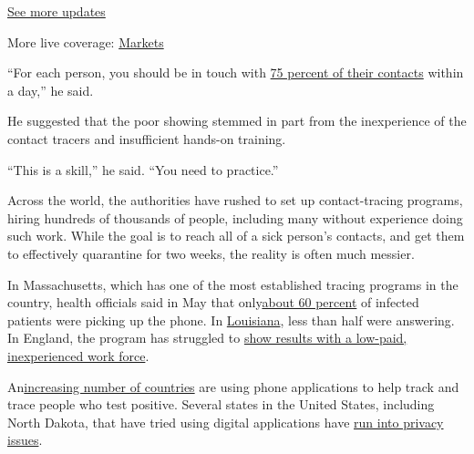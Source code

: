 \href{https://www.nytimes3xbfgragh.onion/2020/08/04/world/coronavirus-cases.html?action=click\&pgtype=Article\&state=default\&region=MAIN_CONTENT_1\&context=storylines_live_updates}{See
more updates}

More live coverage:
\href{https://www.nytimes3xbfgragh.onion/live/2020/08/04/business/stock-market-today-coronavirus?action=click\&pgtype=Article\&state=default\&region=MAIN_CONTENT_1\&context=storylines_live_updates}{Markets}

``For each person, you should be in touch with
\href{https://covidlocal.org/assets/documents/COVID\%20Local\%20Metrics\%20overview.pdf}{75
percent of their contacts} within a day,'' he said.

He suggested that the poor showing stemmed in part from the inexperience
of the contact tracers and insufficient hands-on training.

``This is a skill,'' he said. ``You need to practice.''

Across the world, the authorities have rushed to set up contact-tracing
programs, hiring hundreds of thousands of people, including many without
experience doing such work. While the goal is to reach all of a sick
person's contacts, and get them to effectively quarantine for two weeks,
the reality is often much messier.

In Massachusetts, which has one of the most established tracing programs
in the country, health officials said in May that
only\href{https://www.boston25news.com/news/health/more-than-60-percent-mass-contact-tracing-calls-answered/4NK2EEGVEVCDFBMICEKZXFCXR4/}{about
60 percent} of infected patients were picking up the phone. In
\href{https://www.governing.com/now/Louisiana-Struggles-to-Get-Contact-Tracer-Calls-Answered.html}{Louisiana},
less than half were answering. In England, the program has struggled to
\href{https://www.nytimes3xbfgragh.onion/2020/06/17/world/europe/uk-contact-tracing-coronavirus.html}{show
results with a low-paid, inexperienced work force}.

An\href{https://www.wsj.com/articles/coronavirus-contact-tracing-apps-launch-across-europe-amid-hopes-for-broad-adoption-11592319612}{increasing
number of countries} are using phone applications to help track and
trace people who test positive. Several states in the United States,
including North Dakota, that have tried using digital applications have
\href{https://www.washingtonpost.com/technology/2020/05/21/care19-dakota-privacy-coronavirus/}{run
into privacy issues}.

